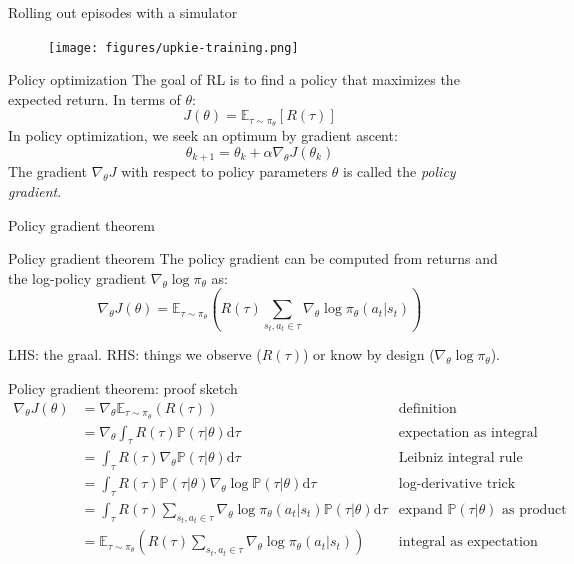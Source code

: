 \documentclass[10pt, aspectratio=1610]{beamer}
\begin{document}
\begin{frame}{Rolling out episodes with a simulator}
    \begin{figure}
        \texttt{[image: figures/upkie-training.png]}
    \end{figure}
\end{frame}

\begin{frame}{Policy optimization}
    The goal of RL is to find a policy that maximizes the expected return. In terms of $\theta$:
    $$
    J(\theta) = \mathbb{E}_{\tau \sim \pi_\theta}[R(\tau)]
    $$
    In policy optimization, we seek an optimum by gradient ascent:
    $$
    \theta_{k+1} = \theta_k + \alpha \nabla_\theta J(\theta_k)
    $$
    The gradient $\nabla_\theta J$ with respect to policy parameters $\theta$ is called the \emph{policy gradient}.
\end{frame}

\begin{frame}{Policy gradient theorem}
    \begin{block}{Policy gradient theorem}
        The policy gradient can be computed from returns and the log-policy gradient $\nabla_\theta \log \pi_\theta$ as:
        \begin{equation*}
            \nabla_\theta J(\theta) = \mathbb{E}_{\tau \sim \pi_\theta} \left(
            R(\tau)
            \sum_{s_t, a_t \in \tau} \nabla_\theta \log \pi_\theta(a_t | s_t)
            \right)
        \end{equation*}
    \end{block}
    LHS: the graal. RHS: things we observe ($R(\tau)$) or know by design ($\nabla_\theta \log \pi_\theta$).
\end{frame}

\begin{frame}{Policy gradient theorem: proof sketch}
    \begin{align*}
        \nabla_{\theta} J(\theta)
        & = \nabla_{\theta} \mathbb{E}_{\tau \sim \pi_{\theta}}(R(\tau)) & \text{definition} \\
        & = \nabla_{\theta} \int_{\tau} R(\tau) \mathbb{P}(\tau|\theta) \mathrm{d}\tau & \text{expectation as integral} \\
        & = \int_{\tau} R(\tau) \nabla_{\theta} \mathbb{P}(\tau|\theta) \mathrm{d}\tau & \text{Leibniz integral rule} \\
        & = \int_{\tau} R(\tau) \mathbb{P}(\tau|\theta) \nabla_{\theta} \log \mathbb{P}(\tau|\theta) \mathrm{d}\tau & \text{log-derivative trick} \\
        & = \int_{\tau} R(\tau) \sum_{s_t, a_t \in \tau} \nabla_\theta \log \pi_\theta(a_t | s_t) \mathbb{P}(\tau|\theta) \mathrm{d}\tau & \text{expand $\mathbb{P}(\tau|\theta)$ as product} \\
        & = \mathbb{E}_{\tau \sim \pi_{\theta}} \left(R(\tau) \sum_{s_t, a_t \in \tau} \nabla_\theta \log \pi_\theta(a_t | s_t)\right) & \text{integral as expectation}
    \end{align*}
\end{frame}
\end{document}
